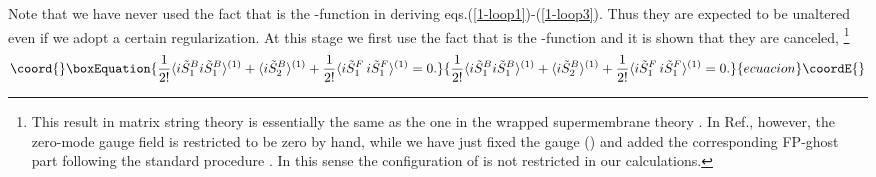 \documentclass[a4paper,12pt]{article}
\providecommand{\vev}[1]{\langle #1 \rangle}
\begin{document}
Note that we have never used the fact that \coordHE{} is the
\myHighlight{$\delta$}\coordHE{}-function in deriving eqs.(\ref{1-loop1})-(\ref{1-loop3}).
Thus they are expected to be unaltered even if we adopt a certain
regularization.
At this stage we first use the fact that \coordHE{} is the
\myHighlight{$\delta$}\coordHE{}-function and it is shown that they are canceled,
\footnote{This result in matrix string theory is essentially
the same as the one in the wrapped supermembrane theory \cite{SY}.
In Ref.\cite{SY}, however, the zero-mode gauge field \coordHE{} is restricted
to be zero by hand, while we have just fixed the gauge (\coordHE{}) and
added the corresponding FP-ghost part following the standard procedure
\cite{KU}. In this sense the configuration of \coordHE{} is not restricted in
our calculations.}
\begin{equation}\coord{}\boxEquation{
 \frac{1}{2!}\vev{i\tilde{S}_{1}^B  i\tilde{S}_{1}^B}^{(1)}
  +\vev{i\tilde{S}_{2}^B}^{(1)}
  + \frac{1}{2!}\vev{i\tilde{S}_{1}^F\,i\tilde{S}_{1}^F}^{(1)}=0.
}{
 \frac{1}{2!}\vev{i\tilde{S}_{1}^B  i\tilde{S}_{1}^B}^{(1)}
  +\vev{i\tilde{S}_{2}^B}^{(1)}
  + \frac{1}{2!}\vev{i\tilde{S}_{1}^F\,i\tilde{S}_{1}^F}^{(1)}=0.
}{ecuacion}\coordE{}\end{equation}
\end{document}
